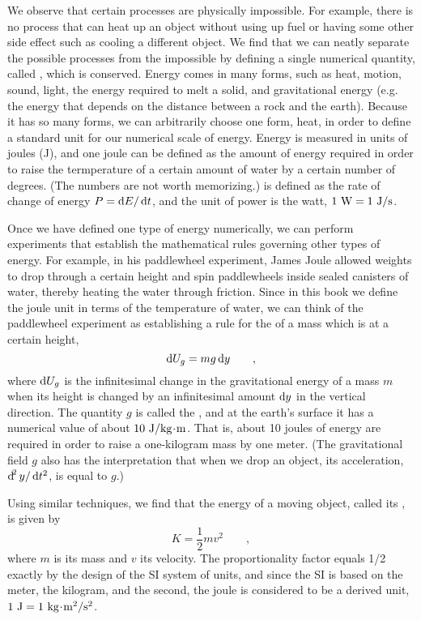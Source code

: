 	We observe that certain processes are physically impossible. For example, there
	is no process that can heat up an object without using up fuel or having some
	other side effect such as cooling a different object. We find that we can
	neatly separate the possible processes from the impossible by
	defining a single numerical quantity, called , which is conserved.
	Energy comes in many forms, such as heat, motion, sound, light, the energy required to melt
	a solid, and gravitational energy (e.g. the energy that depends on the distance between
	a rock and the earth). Because it has so many forms, we can arbitrarily choose
	one form, heat, in order to define a standard unit for our numerical scale of energy.
	Energy is measured in units of joules (J), and one joule can be defined as the amount of energy
	required in order to raise the termperature of a certain amount of water by a certain number
	of degrees. (The numbers are not worth memorizing.)  is defined as the
	rate of change of energy $P=\operatorname{d\!} E/\operatorname{d\!} t$, and the unit of power is the watt,
	$1\ \zu{W}=1\ \junit/\sunit$.
	
	Once we have defined one type of energy numerically, we can perform experiments that establish
	the mathematical rules governing other types of energy. For example, in his paddlewheel
	experiment, James Joule allowed weights to drop through a certain height and spin
	paddlewheels inside sealed canisters of water, thereby heating the water through
	friction. Since in this book we define the joule unit in terms of the temperature of
	water, we can think of the paddlewheel experiment as establishing a rule for
	the  of a mass which is at a certain height,
	\begin{equation*}
		\operatorname{d\!} U_g	= mg\operatorname{d\!} y \qquad ,
	\end{equation*}
	where $\operatorname{d\!} U_g$ is the infinitesimal change in the gravitational energy of
	a mass $m$ when its height is changed by an infinitesimal amount $\operatorname{d\!} y$ in the vertical direction.
	The quantity $g$ is called the , and at the earth's
	surface it has a numerical value of about $10\ \junit/\kgunit\unitdot\munit$. That is,
	about 10 joules of energy are required in order to raise a one-kilogram mass by
	one meter. (The gravitational field $g$ also has the interpretation that
	when we drop an object, its acceleration, $\operatorname{d\!}^2y/\operatorname{d\!} t^2$, is equal to
	$g$.)
	
	Using similar techniques, we find that the energy of a moving object, called its
	, is given by
	\begin{equation*}
		K	= \frac{1}{2}mv^2 \qquad ,
	\end{equation*}
	where $m$ is its mass and $v$ its velocity. The proportionality factor equals
	1/2 exactly by the design of the SI system of units, and since the SI is based
	on the meter, the kilogram, and the second, the joule is considered to be
	a derived unit, $1\ \junit=1\ \kgunit\unitdot\munit^2/\sunit^2$.
	
